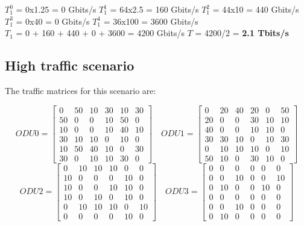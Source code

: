 $T_1^0$ = 0x1.25 = 0 Gbits/s \qquad
$T_1^1$ = 64x2.5 = 160 Gbits/s \qquad
$T_1^2$ = 44x10 = 440 Gbits/s \\

$T_1^3$ = 0x40 = 0 Gbits/s \quad
$T_1^4$ = 36x100 = 3600 Gbits/s \\

$T_{1}$ = 0 + 160 + 440 + 0 + 3600 = 4200 Gbits/s \qquad
$T$ = 4200/2 = \textbf{2.1 Tbits/s}\\

\subsection{High traffic scenario}\label{high_traffic_scenario}

The traffic matrices for this scenario are:

\[
ODU0=
  \begin{bmatrix}
    0 & 50 & 10 & 30 & 10 & 30 \\
    50 & 0 & 0 & 10 & 50 & 0 \\
    10 & 0 & 0 & 10 & 40 & 10 \\
    30 & 10 & 10 & 0 & 10 & 0 \\
    10 & 50 & 40 & 10 & 0 & 30 \\
    30 & 0 & 10 & 10 & 30 & 0
  \end{bmatrix}
\quad ODU1=
  \begin{bmatrix}
    0 & 20 & 40 & 20 & 0 & 50 \\
    20 & 0 & 0 & 30 & 10 & 10 \\
    40 & 0 & 0 & 10 & 10 & 0 \\
    30 & 30 & 10 & 0 & 10 & 30 \\
    0 & 10 & 10 & 10 & 0 & 10 \\
    50 & 10 & 0 & 30 & 10 & 0
  \end{bmatrix}
\]
\[
ODU2=
  \begin{bmatrix}
    0 & 10 & 10 & 10 & 0 & 0 \\
    10 & 0 & 0 & 0 & 10 & 0 \\
    10 & 0 & 0 & 10 & 10 & 0 \\
    10 & 0 & 10 & 0 & 10 & 0 \\
    0 & 10 & 10 & 10 & 0 & 10 \\
    0 & 0 & 0 & 0 & 10 & 0
  \end{bmatrix}
\quad ODU3=
  \begin{bmatrix}
    0 & 0 & 0 & 0 & 0 & 0 \\
    0 & 0 & 10 & 0 & 0 & 10 \\
    0 & 10 & 0 & 0 & 10 & 0 \\
    0 & 0 & 0 & 0 & 0 & 0 \\
    0 & 0 & 10 & 0 & 0 & 0 \\
    0 & 10 & 0 & 0 & 0 & 0
  \end{bmatrix}
\]
